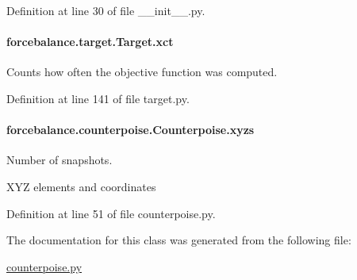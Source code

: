 Definition at line 30 of file \-\_\-\-\_\-init\-\_\-\-\_\-.\-py.

\hypertarget{classforcebalance_1_1target_1_1Target_aad2e385cfbf7b4a68f1c2cb41133fe82}{
\paragraph[{xct}]{\setlength{\rightskip}{0pt plus 5cm}forcebalance.\-target.\-Target.\-xct\hspace{0.3cm}{\ttfamily [inherited]}}}\label{classforcebalance_1_1target_1_1Target_aad2e385cfbf7b4a68f1c2cb41133fe82}


Counts how often the objective function was computed. 



Definition at line 141 of file target.\-py.

\hypertarget{classforcebalance_1_1counterpoise_1_1Counterpoise_a2793b896bff71a3c6b9c6f6568ba1be2}{
\paragraph[{xyzs}]{\setlength{\rightskip}{0pt plus 5cm}forcebalance.\-counterpoise.\-Counterpoise.\-xyzs}}\label{classforcebalance_1_1counterpoise_1_1Counterpoise_a2793b896bff71a3c6b9c6f6568ba1be2}


Number of snapshots. 

X\-Y\-Z elements and coordinates 

Definition at line 51 of file counterpoise.\-py.



The documentation for this class was generated from the following file\-:\begin{DoxyCompactItemize}
\item 
\hyperlink{counterpoise_8py}{counterpoise.\-py}\end{DoxyCompactItemize}
